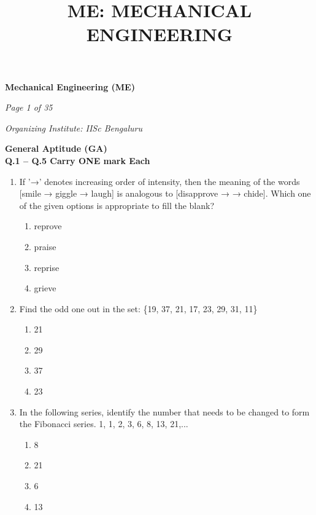 \documentclass[journal,11pt,onecolumn]{IEEEtran}
\title{ME: MECHANICAL ENGINEERING}
\begin{document}
\begin{center}

    \Large

    \textbf{Mechanical Engineering (ME)}

\end{center}

\textit{Page 1 of 35}

\hfill

\textit{Organizing Institute: IISc Bengaluru}

\large\textbf{General Aptitude (GA)}\\

\large\textbf{Q.1 – Q.5 Carry ONE mark Each}\\

\begin{enumerate}

    \item If '→' denotes increasing order of intensity, then the meaning of the words [smile → giggle → laugh] is analogous to [disapprove → \underline{\hspace{2cm}} → chide]. Which one of the given options is appropriate to fill the blank?

          \begin{enumerate}
              \item reprove
              \item praise
              \item reprise
              \item grieve
          \end{enumerate}

    \item Find the odd one out in the set: \{19, 37, 21, 17, 23, 29, 31, 11\}

          \begin{enumerate}
              \item 21
              \item 29
              \item 37
              \item 23
          \end{enumerate}

    \item In the following series, identify the number that needs to be changed to form the Fibonacci series.
          1, 1, 2, 3, 6, 8, 13, 21,...

          \begin{enumerate}
              \item 8
              \item 21
              \item 6
              \item 13
          \end{enumerate}


\end{enumerate}
\end{document}
